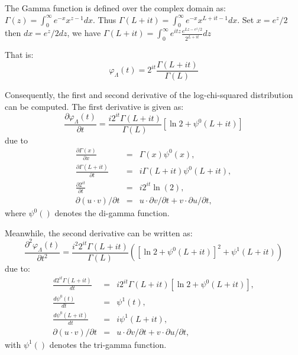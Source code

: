 \documentclass[journal,12pt,draftcls,onecolumn]{IEEEtran}
\begin{document}
The Gamma function is defined over the complex domain as:
$\Gamma(z) = \int_0^\infty  e^{-x} x^{z-1} dx .$
Thus $\Gamma(L+it) = \int_0^\infty  e^{-x} x^{L+it-1} dx .$
Set $x=e^z/2$ then $dx=e^z/2dz$, we have $\Gamma(L+it)= \int_0^\infty  e^{itz} \frac{e^{Lz-e^z/2}}{2^{L+it}} dz$

That is:
\begin{equation}
\varphi_\Lambda(t) = 2^{it} \frac{\Gamma(L+it)}{\Gamma(L)}  
\end{equation}

Consequently, the first and second derivative of the log-chi-squared distribution can be computed.
The first derivative is given as:
\begin{equation}
  \frac{\partial \varphi_\Lambda(t)}{\partial t} = \frac{i 2^{it} \Gamma(L+it)}{\Gamma(L)} \left[ \ln{2} + \psi^0(L+it) \right]
\end{equation}
due to
\begin{eqnarray*}
  \frac{\partial \Gamma(x)}{\partial x} &=& \Gamma(x)\psi^0(x), \\
  \frac{\partial \Gamma(L+it)}{\partial t} &=& i\Gamma(L+it)\psi^0(L+it), \\
  \frac{\partial 2^{it}}{\partial t} &=& i2^{it}\ln(2), \\
  \partial (u \cdot v) / \partial t &=& u \cdot \partial v /\partial t + v \cdot \partial u/\partial t, 
\end{eqnarray*}
where $\psi^0()$ denotes the di-gamma function.

Meanwhile, the second derivative can be written as:
\begin{equation}
  \frac{\partial ^2 \varphi_\Lambda(t)}{\partial t^2} = \frac{i^2 2^{it} \Gamma(L+it)}{\Gamma(L)} \left( \left[ \ln{2} + \psi^0(L+it) \right] ^ 2 + \psi^1(L+it) \right)
\end{equation}
due to:
\begin{eqnarray*}
  \frac{d 2^{it} \Gamma(L+it)}{dt} &=& i 2^{it} \Gamma(L+it) \left[ \ln{2} + \psi^0(L+it) \right], \\
  \frac{d \psi^0(t)}{dt} &=& \psi^1(t), \\
  \frac{d \psi^0(L+it)}{dt} &=& i \psi^1(L+it), \\
  \partial (u \cdot v) / \partial t &=& u \cdot \partial v /\partial t + v \cdot \partial u/\partial t,
\end{eqnarray*}
with $\psi^1()$ denotes the tri-gamma function.
\end{document}
